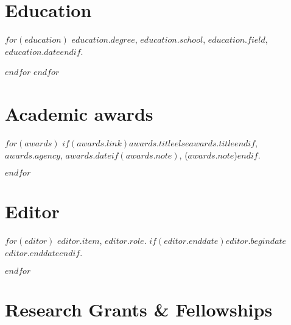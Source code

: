 \documentclass[11pt]{article}
\title{}
\def\printdate#1{\xprintdate#1-}
\def\xprintdate#1-#2-#3-{#1}
\def\daterange#1#2{\xprintdate#1---\xprintdate#2-}
\begin{document}
\maketitle

\section{Education}

$for(education)$
\ind $education.degree$, \textbf{$education.school$}, $education.field$, \printdate{$education.date$}$if(education.info)$ ($education.info$)
$else$

$endif$
$endfor$

\section{Appointments}

$for(appointment)$
\subsection{$appointment.place$}
$for(appointment.items)$
\ind $appointment.items.item$. $if(appointment.items.enddate)$\daterange{$appointment.items.begindate$}{$appointment.items.enddate$}$else$\printdate{$appointment.items.begindate$}--$endif$.

$endfor$
$endfor$

\section{Academic awards}

$for(awards)$
\ind \textit{$if(awards.link)$\href{$awards.link$}{$awards.title$}$else$$awards.title$$endif$}, $awards.agency$, $awards.date$$if(awards.note)$, ($awards.note$)$endif$.

$endfor$

\section{Editor}

$for(editor)$
\ind \textit{\href{$editor.link$}{$editor.item$}}, $editor.role$. $if(editor.enddate)$\daterange{$editor.begindate$}{$editor.enddate$}$else$\printdate{$editor.begindate$}--$endif$.

$endfor$

\section{Research Grants \& Fellowships}
\end{document}
